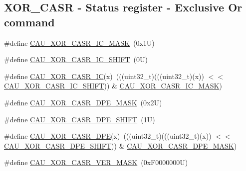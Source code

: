\subsection*{X\+O\+R\+\_\+\+C\+A\+SR -\/ Status register -\/ Exclusive Or command}
\begin{DoxyCompactItemize}
\item 
\#define \mbox{\hyperlink{group___c_a_u___register___masks_gaca3c61b76adc9812ea3851c4b704c43f}{C\+A\+U\+\_\+\+X\+O\+R\+\_\+\+C\+A\+S\+R\+\_\+\+I\+C\+\_\+\+M\+A\+SK}}~(0x1\+U)
\item 
\#define \mbox{\hyperlink{group___c_a_u___register___masks_ga371852a2013f6f7d79b8fcd434367358}{C\+A\+U\+\_\+\+X\+O\+R\+\_\+\+C\+A\+S\+R\+\_\+\+I\+C\+\_\+\+S\+H\+I\+FT}}~(0\+U)
\item 
\#define \mbox{\hyperlink{group___c_a_u___register___masks_gadcc6093034c6b687c8cf9d74eb7f1170}{C\+A\+U\+\_\+\+X\+O\+R\+\_\+\+C\+A\+S\+R\+\_\+\+IC}}(x)~(((uint32\+\_\+t)(((uint32\+\_\+t)(x)) $<$$<$ \mbox{\hyperlink{group___c_a_u___register___masks_ga371852a2013f6f7d79b8fcd434367358}{C\+A\+U\+\_\+\+X\+O\+R\+\_\+\+C\+A\+S\+R\+\_\+\+I\+C\+\_\+\+S\+H\+I\+FT}})) \& \mbox{\hyperlink{group___c_a_u___register___masks_gaca3c61b76adc9812ea3851c4b704c43f}{C\+A\+U\+\_\+\+X\+O\+R\+\_\+\+C\+A\+S\+R\+\_\+\+I\+C\+\_\+\+M\+A\+SK}})
\item 
\#define \mbox{\hyperlink{group___c_a_u___register___masks_ga71d1db03ca6c06a051297201f2e8d855}{C\+A\+U\+\_\+\+X\+O\+R\+\_\+\+C\+A\+S\+R\+\_\+\+D\+P\+E\+\_\+\+M\+A\+SK}}~(0x2\+U)
\item 
\#define \mbox{\hyperlink{group___c_a_u___register___masks_ga2c2901b4531d55d9625468c78cea25b0}{C\+A\+U\+\_\+\+X\+O\+R\+\_\+\+C\+A\+S\+R\+\_\+\+D\+P\+E\+\_\+\+S\+H\+I\+FT}}~(1\+U)
\item 
\#define \mbox{\hyperlink{group___c_a_u___register___masks_ga5b5542f7c83768703639a686519cf26a}{C\+A\+U\+\_\+\+X\+O\+R\+\_\+\+C\+A\+S\+R\+\_\+\+D\+PE}}(x)~(((uint32\+\_\+t)(((uint32\+\_\+t)(x)) $<$$<$ \mbox{\hyperlink{group___c_a_u___register___masks_ga2c2901b4531d55d9625468c78cea25b0}{C\+A\+U\+\_\+\+X\+O\+R\+\_\+\+C\+A\+S\+R\+\_\+\+D\+P\+E\+\_\+\+S\+H\+I\+FT}})) \& \mbox{\hyperlink{group___c_a_u___register___masks_ga71d1db03ca6c06a051297201f2e8d855}{C\+A\+U\+\_\+\+X\+O\+R\+\_\+\+C\+A\+S\+R\+\_\+\+D\+P\+E\+\_\+\+M\+A\+SK}})
\item 
\#define \mbox{\hyperlink{group___c_a_u___register___masks_ga1ac156673986e2dc85b9d9491a3d4bf2}{C\+A\+U\+\_\+\+X\+O\+R\+\_\+\+C\+A\+S\+R\+\_\+\+V\+E\+R\+\_\+\+M\+A\+SK}}~(0x\+F0000000\+U)
\item 

\end{DoxyCompactItemize}

